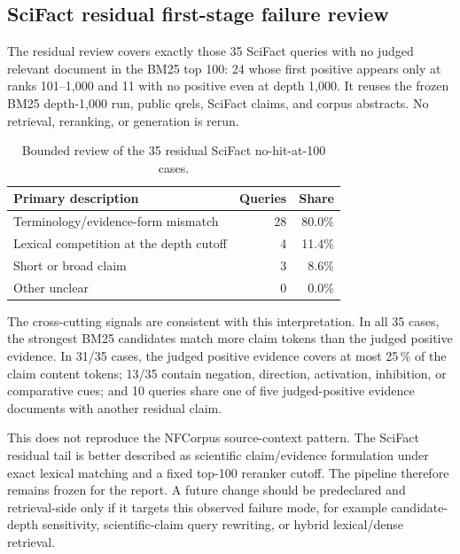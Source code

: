 \documentclass[11pt,a4paper]{article}
\newcommand{\bmtwofive}{BM25}
\begin{document}
\subsection{SciFact residual first-stage failure review}
\label{sec:scifact-residual-review}

The residual review covers exactly those 35 SciFact queries with no
judged relevant document in the \bmtwofive{} top 100: 24 whose first
positive appears only at ranks 101--1,000 and 11 with no positive even
at depth 1,000.  It reuses the frozen \bmtwofive{} depth-1,000 run,
public qrels, SciFact claims, and corpus abstracts.  No retrieval,
reranking, or generation is rerun.

\begin{table}[H]
  \centering\small
  \caption{Bounded review of the 35 residual SciFact no-hit-at-100 cases.}
  \label{tab:scifact-residual-review}
  \begin{tabularx}{\linewidth}{Xrr}
    \toprule
    Primary description & Queries & Share \\
    \midrule
    Terminology/evidence-form mismatch & 28 & 80.0\% \\
    Lexical competition at the depth cutoff & 4 & 11.4\% \\
    Short or broad claim & 3 & 8.6\% \\
    Other unclear & 0 & 0.0\% \\
    \bottomrule
  \end{tabularx}
\end{table}

The cross-cutting signals are consistent with this interpretation.  In
all 35 cases, the strongest \bmtwofive{} candidates match more claim
tokens than the judged positive evidence.  In 31/35 cases, the judged
positive evidence covers at most 25\,\% of the claim content tokens;
13/35 contain negation, direction, activation, inhibition, or
comparative cues; and 10 queries share one of five judged-positive
evidence documents with another residual claim.

This does not reproduce the NFCorpus source-context pattern.  The
SciFact residual tail is better described as scientific claim/evidence
formulation under exact lexical matching and a fixed top-100 reranker
cutoff.  The pipeline therefore remains frozen for the report.  A
future change should be predeclared and retrieval-side only if it
targets this observed failure mode, for example candidate-depth
sensitivity, scientific-claim query rewriting, or hybrid lexical/dense
retrieval.
\end{document}

